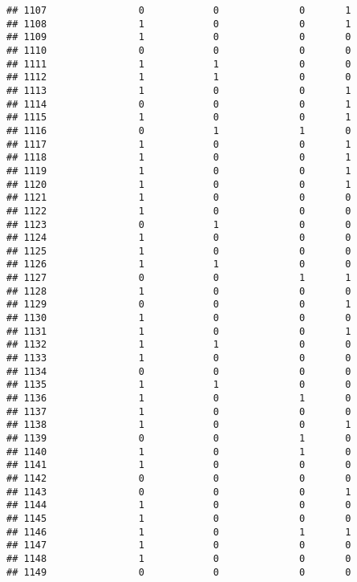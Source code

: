 \documentclass[]{article}
\begin{document}
\begin{verbatim}
## 1107                0            0              0       1
## 1108                1            0              0       1
## 1109                1            0              0       0
## 1110                0            0              0       0
## 1111                1            1              0       0
## 1112                1            1              0       0
## 1113                1            0              0       1
## 1114                0            0              0       1
## 1115                1            0              0       1
## 1116                0            1              1       0
## 1117                1            0              0       1
## 1118                1            0              0       1
## 1119                1            0              0       1
## 1120                1            0              0       1
## 1121                1            0              0       0
## 1122                1            0              0       0
## 1123                0            1              0       0
## 1124                1            0              0       0
## 1125                1            0              0       0
## 1126                1            1              0       0
## 1127                0            0              1       1
## 1128                1            0              0       0
## 1129                0            0              0       1
## 1130                1            0              0       0
## 1131                1            0              0       1
## 1132                1            1              0       0
## 1133                1            0              0       0
## 1134                0            0              0       0
## 1135                1            1              0       0
## 1136                1            0              1       0
## 1137                1            0              0       0
## 1138                1            0              0       1
## 1139                0            0              1       0
## 1140                1            0              1       0
## 1141                1            0              0       0
## 1142                0            0              0       0
## 1143                0            0              0       1
## 1144                1            0              0       0
## 1145                1            0              0       0
## 1146                1            0              1       1
## 1147                1            0              0       0
## 1148                1            0              0       0
## 1149                0            0              0       0

\end{verbatim}
\end{document}
